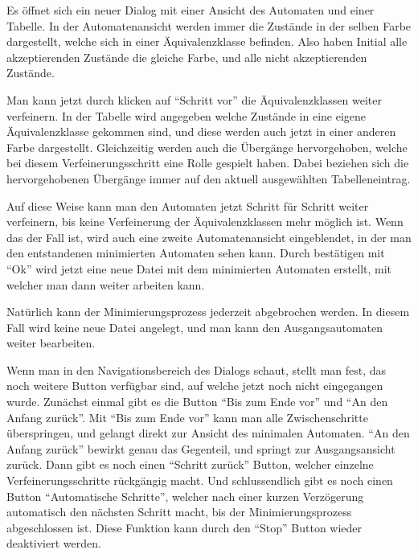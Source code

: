   Es öffnet sich ein neuer Dialog mit einer Ansicht des Automaten und einer
  Tabelle. In der Automatenansicht werden immer die Zustände in der selben Farbe
  dargestellt, welche sich in einer Äquivalenzklasse befinden. Also haben Initial
  alle akzeptierenden Zustände die gleiche Farbe, und alle nicht akzeptierenden
  Zustände.\vspace{10pt}
  
  Man kann jetzt durch klicken auf "`Schritt vor"' die Äquivalenzklassen weiter
  verfeinern. In der Tabelle wird angegeben welche Zustände in eine eigene
  Äquivalenzklasse gekommen sind, und diese werden auch jetzt in einer anderen
  Farbe dargestellt. Gleichzeitig werden auch die Übergänge hervorgehoben, welche
  bei diesem Verfeinerungsschritt eine Rolle gespielt haben. Dabei beziehen sich
  die hervorgehobenen Übergänge immer auf den aktuell ausgewählten
  Tabelleneintrag.\vspace{10pt}
  
  Auf diese Weise kann man den Automaten jetzt Schritt für Schritt weiter
  verfeinern, bis keine Verfeinerung der Äquivalenzklassen mehr möglich ist. Wenn
  das der Fall ist, wird auch eine zweite Automatenansicht eingeblendet, in der
  man den entstandenen minimierten Automaten sehen kann. Durch bestätigen mit
  "`Ok"' wird jetzt eine neue Datei mit dem minimierten Automaten erstellt, mit
  welcher man dann weiter arbeiten kann.\vspace{10pt}
  
  Natürlich kann der Minimierungsprozess jederzeit abgebrochen werden. In diesem
  Fall wird keine neue Datei angelegt, und man kann den Ausgangsautomaten weiter
  bearbeiten. \vspace{10pt}
  
  Wenn man in den Navigationsbereich des Dialogs schaut, stellt man fest, das
  noch weitere Button verfügbar sind, auf welche jetzt noch nicht eingegangen
  wurde. Zunächst einmal gibt es die Button "`Bis zum Ende vor"' und "`An den
  Anfang zurück"'. Mit "`Bis zum Ende vor"' kann man alle Zwischenschritte
  überspringen, und gelangt direkt zur Ansicht des minimalen Automaten. "`An den
  Anfang zurück"' bewirkt genau das Gegenteil, und springt zur Ausgangsansicht
  zurück. Dann gibt es noch einen "`Schritt zurück"' Button, welcher einzelne
  Verfeinerungsschritte rückgängig macht. Und schlussendlich gibt es noch einen
  Button "`Automatische Schritte"', welcher nach einer kurzen Verzögerung
  automatisch den nächsten Schritt macht, bis der Minimierungsprozess
  abgeschlossen ist. Diese Funktion kann durch den "`Stop"' Button wieder
  deaktiviert werden.\vspace{10pt}
  
